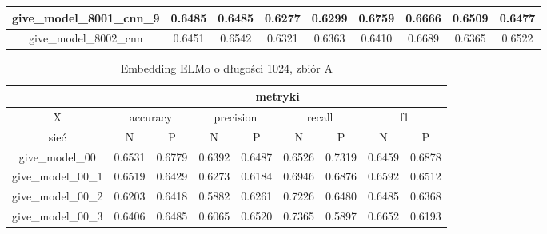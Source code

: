 \begin{table}[!h]
\begin{tabular}{|c|c|c|c|c|c|c|c|c|}
        give\_model\_8001\_cnn\_9         & 0.6485                        & 0.6485                         & 0.6277                      & 0.6299                  & 0.6759 & 0.6666 & 0.6509 & 0.6477 \\ \hline
        give\_model\_8002\_cnn            & 0.6451                        & 0.6542                         & 0.6321                      & 0.6363                  & 0.6410 & 0.6689 & 0.6365 & 0.6522 \\ \hline
    \end{tabular}
\end{table}


\begin{table}[!h] \label{tab:wyniki_elmo_A} \centering
    \caption{Embedding ELMo o długości 1024, zbiór A}
    \begin{tabular}{|c|c|c|c|c|c|c|c|c|}    \hline
                                          & \multicolumn{8}{c|}{metryki}                                                                                                                               \\ \hline
        X                                 & \multicolumn{2}{c|}{accuracy} & \multicolumn{2}{c|}{precision} & \multicolumn{2}{c|}{recall} & \multicolumn{2}{c|}{f1}                                     \\ \hline
        sieć                              & N                             & P                              & N                           & P                       & N      & P      & N      & P      \\ \hline
        give\_model\_00                   & 0.6531                        & 0.6779                         & 0.6392                      & 0.6487                  & 0.6526 & 0.7319 & 0.6459 & 0.6878 \\ \hline
        give\_model\_00\_1                & 0.6519                        & 0.6429                         & 0.6273                      & 0.6184                  & 0.6946 & 0.6876 & 0.6592 & 0.6512 \\ \hline
        give\_model\_00\_2                & 0.6203                        & 0.6418                         & 0.5882                      & 0.6261                  & 0.7226 & 0.6480 & 0.6485 & 0.6368 \\ \hline
        give\_model\_00\_3                & 0.6406                        & 0.6485                         & 0.6065                      & 0.6520                  & 0.7365 & 0.5897 & 0.6652 & 0.6193 \\ \hline

\end{tabular}
\end{table}
